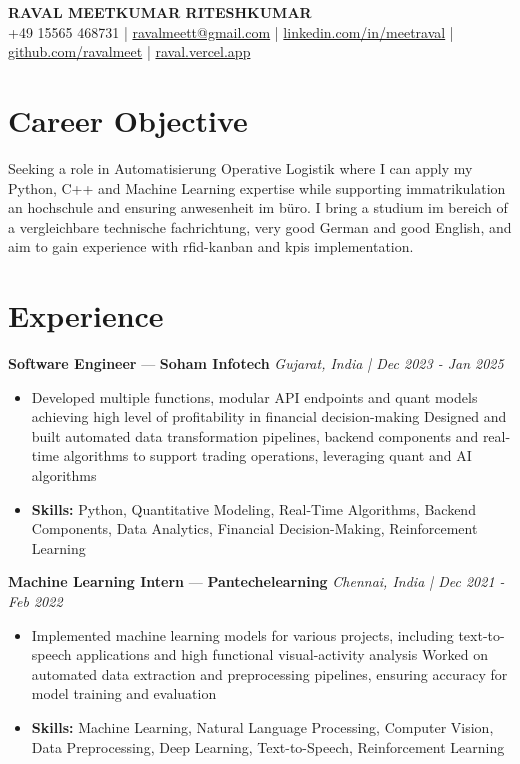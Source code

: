 \documentclass[a4paper,10pt]{article}
\begin{document}
\begin{center}
  {\Large\bfseries RAVAL MEETKUMAR RITESHKUMAR}\\[2pt]
  {\small +49 15565 468731 \;|\; \href{mailto:ravalmeett@gmail.com}{ravalmeett@gmail.com} \;|\; \href{https://www.linkedin.com/in/meetraval/}{linkedin.com/in/meetraval} \;|\; \href{https://github.com/ravalmeet}{github.com/ravalmeet} \;|\; \href{https://raval.vercel.app/}{raval.vercel.app}}
\end{center}
\vspace{-3pt}

\section*{Career Objective}
Seeking a role in Automatisierung Operative Logistik where I can apply my Python, C++ and Machine Learning expertise while supporting immatrikulation an hochschule and ensuring anwesenheit im büro. I bring a studium im bereich of a vergleichbare technische fachrichtung, very good German and good English, and aim to gain experience with rfid-kanban and kpis implementation.\par

\section*{Experience}
\textbf{Software Engineer} — \textbf{Soham Infotech} \hfill \textit{Gujarat, India \;|\; Dec 2023 - Jan 2025}\par
\vspace{1pt}
\begin{itemize}
  \item Developed multiple functions, modular API endpoints and quant models achieving high level of profitability in financial decision-making Designed and built automated data transformation pipelines, backend components and real-time algorithms to support trading operations, leveraging quant and AI algorithms
  \item \textbf{Skills:} Python, Quantitative Modeling, Real-Time Algorithms, Backend Components, Data Analytics, Financial Decision-Making, Reinforcement Learning
\end{itemize}
\vspace{3pt}
\textbf{Machine Learning Intern} — \textbf{Pantechelearning} \hfill \textit{Chennai, India \;|\; Dec 2021 - Feb 2022}\par
\vspace{1pt}
\begin{itemize}
  \item Implemented machine learning models for various projects, including text-to-speech applications and high functional visual-activity analysis Worked on automated data extraction and preprocessing pipelines, ensuring accuracy for model training and evaluation
  \item \textbf{Skills:} Machine Learning, Natural Language Processing, Computer Vision, Data Preprocessing, Deep Learning, Text-to-Speech, Reinforcement Learning
\end{itemize}
\end{document}
